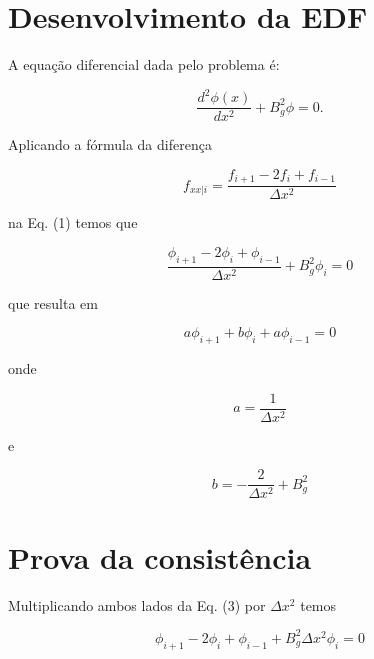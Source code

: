 \documentclass{article}
\begin{document}
    \section{Desenvolvimento da EDF}
    
        A equação diferencial dada pelo problema é:
        
        \begin{equation}
            \frac{d^2\phi(x)}{dx^2}  + B_g^2 \phi = 0.
        \end{equation}
        
        Aplicando a fórmula da diferença
        
        \begin{equation}
            f_{xx|i} = \frac{f_{i+1} - 2 f_i + f_{i-1}}{\Delta x^2} 
        \end{equation}
        
        na Eq. (1) temos que
        
        \begin{equation}
            \frac{\phi_{i+1} - 2 \phi_i + \phi_{i-1}}{\Delta x^2} + B_g^2 \phi_i = 0
        \end{equation}
        
        que resulta em
        
        \begin{equation}
            a \phi_{i+1} + b \phi_i + a \phi_{i-1} = 0
        \end{equation}
        
        onde
        
        \begin{equation}
            a = \frac{1}{\Delta x^2}
        \end{equation}
        
        e
        
        \begin{equation}
            b = -\frac{2}{\Delta x^2} + B_g^2
        \end{equation}
    
    \section{Prova da consistência}

        Multiplicando ambos lados da Eq. (3) por $\Delta x^2$ temos
    
        \begin{equation}
            \phi_{i+1} - 2 \phi_i + \phi_{i-1} + B_g^2 \Delta x^2 \phi_i = 0
        \end{equation}
\end{document}

